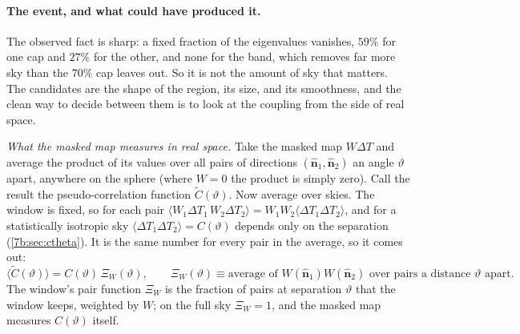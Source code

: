 \paragraph{The event, and what could have produced it.}
The observed fact is sharp: a fixed fraction of the eigenvalues vanishes, $59\%$ for one cap and
$27\%$ for the other, and none for the band, which removes far more sky than the $70\%$ cap
leaves out. So it is not the amount of sky that matters. The candidates are the shape of the
region, its size, and its smoothness, and the clean way to decide between them is to look at the
coupling from the side of real space.

\emph{What the masked map measures in real space.} Take the masked map $W\Delta T$ and average the product
of its values over all pairs of directions $(\hat{\bm n}_1,\hat{\bm n}_2)$ an angle $\vartheta$ apart, anywhere on the
sphere (where $W=0$ the product is simply zero). Call the result the pseudo-correlation function
$\widetilde C(\vartheta)$. Now average over skies. The window is fixed, so for each pair
$\langle W_1\Delta T_1\,W_2\Delta T_2\rangle=W_1W_2\langle\Delta T_1\Delta T_2\rangle$, and for a statistically isotropic sky
$\langle\Delta T_1\Delta T_2\rangle=C(\vartheta)$ depends only on the separation (\cref{7b:sec:ctheta}). It is the same number
for every pair in the average, so it comes out:
\[
  \langle\widetilde C(\vartheta)\rangle=C(\vartheta)\,\Xi_W(\vartheta),\qquad
  \Xi_W(\vartheta)\equiv\text{average of }W(\hat{\bm n}_1)W(\hat{\bm n}_2)\text{ over pairs a distance }\vartheta\text{ apart}.
\]
The window's pair function $\Xi_W$ is the fraction of pairs at separation $\vartheta$ that the window keeps,
weighted by $W$; on the full sky $\Xi_W=1$, and the masked map measures $C(\vartheta)$ itself.

